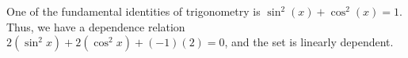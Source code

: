 One of the fundamental identities of trigonometry is $\sin^2(x) + \cos^2(x) = 1$.  Thus, we have a dependence relation $2(\sin^2{x}) + 2(\cos^2{x}) + (-1)(2) = 0$, and the set is linearly dependent.
%